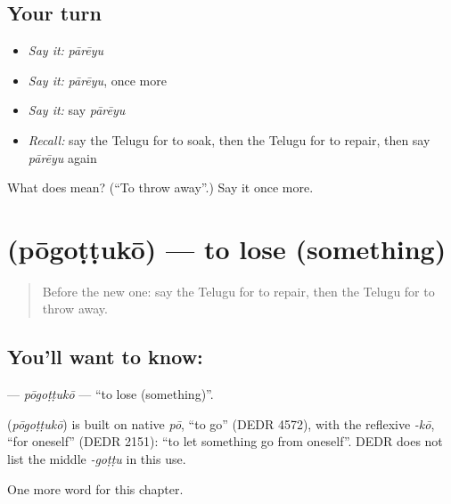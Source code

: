 \subsection*{Your turn}
\begin{itemize}
\raggedright
  \item \emph{Say it:} \emph{pārēyu}
  \item \emph{Say it:} \emph{pārēyu}, once more
  \item \emph{Say it:} say \emph{pārēyu}
  \item \emph{Recall:} say the Telugu for to soak, then the Telugu for to repair, then say \emph{pārēyu} again
\end{itemize}

\begin{tcolorbox}[breakable,colback=teal!4,colframe=teal!35!black,title={Before you move on}]
What does  mean? (\textquotedblleft{}To throw away\textquotedblright{}.) Say it once more.
\end{tcolorbox}
\section[\texorpdfstring{\te{పోగొట్టుకో} (pōgoṭṭukō)}{పోగొట్టుకో (pōgoṭṭukō)}]{ (pōgoṭṭukō) — to lose (something)}

\label{lesson:TE-C159-pogottuko}



\begin{quote}
Before the new one: say the Telugu for to repair, then the Telugu for to throw away.
\end{quote}

\subsection*{You'll want to know: }
\textbf{} — \emph{pōgoṭṭukō} — \textquotedblleft{}to lose (something)\textquotedblright{}.

\begin{cousinweb}
\textbf{} (\emph{pōgoṭṭukō}) is built on native \emph{pō}, \textquotedblleft{}to go\textquotedblright{} (DEDR 4572), with the reflexive \emph{-kō}, \textquotedblleft{}for oneself\textquotedblright{} (DEDR 2151): \textquotedblleft{}to let something go from oneself\textquotedblright{}. DEDR does not list the middle \emph{-goṭṭu} in this use.
\end{cousinweb}

\begin{grammarlens}[title={What you've built}]
One more word for this chapter.
\end{grammarlens}

